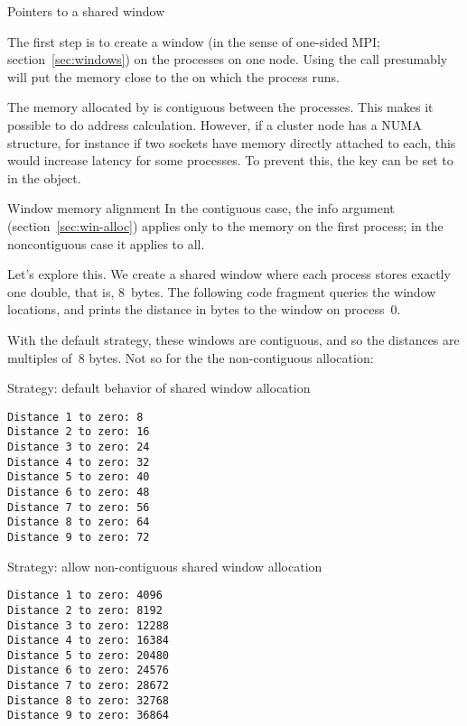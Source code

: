  {Pointers to a shared window}

The first step is to create a window (in the sense of one-sided MPI;
section~\ref{sec:windows}) on the processes on one node.
Using the  call presumably will
put the memory close to the 
 on which the process runs.


The memory allocated by  is
contiguous between the processes. This makes it possible to do address
calculation. However, if a cluster node has a \ac{NUMA} structure, for
instance if two sockets have memory directly attached to each, this
would increase latency for some processes. To prevent this, the key
 can be set to  in the
 object.
\begin{mpifournote}{Window memory alignment}
  In the contiguous case, the 
  info argument
  (section~\ref{sec:win-alloc})
  applies only to the memory on the first process;
  in the noncontiguous case it applies to all.
\end{mpifournote}


Let's explore this.
We create a shared window where each process stores exactly one double,
that is, 8~bytes.
The following code fragment queries the window locations,
and prints the distance in bytes to the window on process~0.
%

With the default strategy, these windows are contiguous,
and so the distances are multiples of~8 bytes.
Not so for the the non-contiguous allocation:
%
\begin{multicols}{2}
Strategy: default behavior of shared window allocation
\begin{verbatim}
Distance 1 to zero: 8
Distance 2 to zero: 16
Distance 3 to zero: 24
Distance 4 to zero: 32
Distance 5 to zero: 40
Distance 6 to zero: 48
Distance 7 to zero: 56
Distance 8 to zero: 64
Distance 9 to zero: 72
\end{verbatim}
\columnbreak
Strategy: allow non-contiguous shared window allocation
\begin{verbatim}
Distance 1 to zero: 4096
Distance 2 to zero: 8192
Distance 3 to zero: 12288
Distance 4 to zero: 16384
Distance 5 to zero: 20480
Distance 6 to zero: 24576
Distance 7 to zero: 28672
Distance 8 to zero: 32768
Distance 9 to zero: 36864
\end{verbatim}
\end{multicols}

